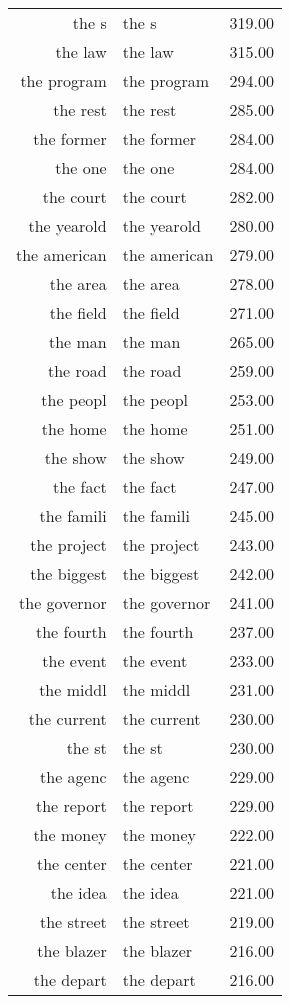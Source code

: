 \begin{table}[ht]
\begin{tabular}{rlr}
  the s & the s & 319.00 \\ 
  the law & the law & 315.00 \\ 
  the program & the program & 294.00 \\ 
  the rest & the rest & 285.00 \\ 
  the former & the former & 284.00 \\ 
  the one & the one & 284.00 \\ 
  the court & the court & 282.00 \\ 
  the yearold & the yearold & 280.00 \\ 
  the american & the american & 279.00 \\ 
  the area & the area & 278.00 \\ 
  the field & the field & 271.00 \\ 
  the man & the man & 265.00 \\ 
  the road & the road & 259.00 \\ 
  the peopl & the peopl & 253.00 \\ 
  the home & the home & 251.00 \\ 
  the show & the show & 249.00 \\ 
  the fact & the fact & 247.00 \\ 
  the famili & the famili & 245.00 \\ 
  the project & the project & 243.00 \\ 
  the biggest & the biggest & 242.00 \\ 
  the governor & the governor & 241.00 \\ 
  the fourth & the fourth & 237.00 \\ 
  the event & the event & 233.00 \\ 
  the middl & the middl & 231.00 \\ 
  the current & the current & 230.00 \\ 
  the st & the st & 230.00 \\ 
  the agenc & the agenc & 229.00 \\ 
  the report & the report & 229.00 \\ 
  the money & the money & 222.00 \\ 
  the center & the center & 221.00 \\ 
  the idea & the idea & 221.00 \\ 
  the street & the street & 219.00 \\ 
  the blazer & the blazer & 216.00 \\ 
  the depart & the depart & 216.00 \\ 

\end{tabular}
\end{table}
